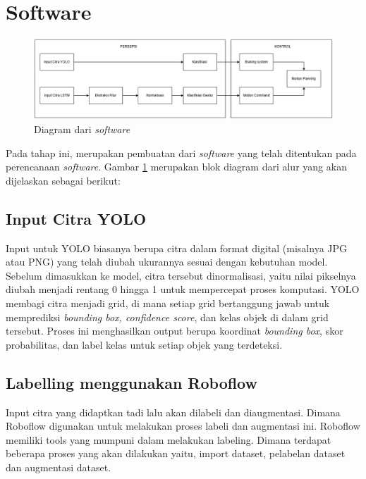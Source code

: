 \section{Software}
\begin{figure} [H] \centering
  \includegraphics[scale=0.4]{gambar/software new.jpg}
  \caption{Diagram dari \emph{software}}
  \label{fig:diagram software}
\end{figure}
Pada tahap ini, merupakan pembuatan dari \emph{software} yang telah ditentukan pada perencanaan \emph{software}. Gambar \ref{fig:diagram software} merupakan blok diagram dari alur yang akan dijelaskan sebagai berikut:

\subsection{Input Citra YOLO}
Input untuk YOLO biasanya berupa citra dalam format digital (misalnya JPG atau PNG) yang telah diubah ukurannya sesuai dengan kebutuhan model. Sebelum dimasukkan ke model, citra tersebut dinormalisasi, yaitu nilai pikselnya diubah menjadi rentang 0 hingga 1 untuk mempercepat proses komputasi. YOLO membagi citra menjadi grid, di mana setiap grid bertanggung jawab untuk memprediksi \emph{bounding box, confidence score}, dan kelas objek di dalam grid tersebut. Proses ini menghasilkan output berupa koordinat\emph{ bounding box}, skor probabilitas, dan label kelas untuk setiap objek yang terdeteksi.

\subsection{Labelling menggunakan Roboflow}
Input citra yang didaptkan tadi lalu akan dilabeli dan diaugmentasi. Dimana Roboflow digunakan untuk melakukan proses labeli dan augmentasi ini. Roboflow memiliki tools yang mumpuni dalam melakukan labeling. Dimana terdapat beberapa proses yang akan dilakukan yaitu, import dataset, pelabelan dataset dan augmentasi dataset.

